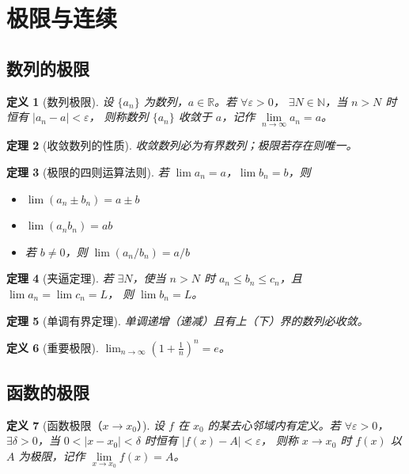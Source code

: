 \documentclass[12pt,a4paper]{ctexart}
\newtheorem{theorem}{定理}[section]
\newtheorem{definition}[theorem]{定义}
\theoremstyle{remark}
\begin{document}
\section{极限与连续}

\subsection{数列的极限}

\begin{definition}[数列极限]
设 $\{a_n\}$ 为数列，$a \in \mathbb{R}$。若 $\forall \varepsilon > 0$，
$\exists N \in \mathbb{N}$，当 $n > N$ 时恒有 $|a_n - a| < \varepsilon$，
则称数列 $\{a_n\}$ 收敛于 $a$，记作 $\lim\limits_{n\to\infty} a_n = a$。
\end{definition}

\begin{theorem}[收敛数列的性质]
收敛数列必为有界数列；极限若存在则唯一。
\end{theorem}

\begin{theorem}[极限的四则运算法则]
若 $\lim a_n = a$，$\lim b_n = b$，则
\begin{itemize}
  \item $\lim (a_n \pm b_n) = a \pm b$
  \item $\lim (a_n b_n) = ab$
  \item 若 $b \neq 0$，则 $\lim (a_n / b_n) = a/b$
\end{itemize}
\end{theorem}

\begin{theorem}[夹逼定理]
若 $\exists N$，使当 $n > N$ 时 $a_n \le b_n \le c_n$，且 $\lim a_n = \lim c_n = L$，
则 $\lim b_n = L$。
\end{theorem}

\begin{theorem}[单调有界定理]
单调递增（递减）且有上（下）界的数列必收敛。
\end{theorem}

\begin{definition}[重要极限]
$\displaystyle\lim_{n\to\infty}\left(1+\frac{1}{n}\right)^n = e$。
\end{definition}

\subsection{函数的极限}

\begin{definition}[函数极限（$x \to x_0$）]
设 $f$ 在 $x_0$ 的某去心邻域内有定义。若 $\forall \varepsilon > 0$，
$\exists \delta > 0$，当 $0 < |x - x_0| < \delta$ 时恒有 $|f(x) - A| < \varepsilon$，
则称 $x \to x_0$ 时 $f(x)$ 以 $A$ 为极限，记作 $\lim\limits_{x\to x_0} f(x) = A$。
\end{definition}
\end{document}
